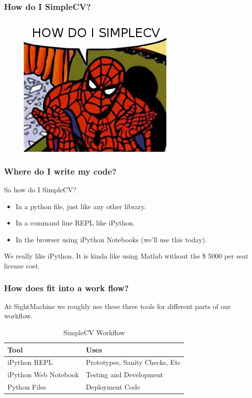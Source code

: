 \documentclass{beamer}
\begin{document}
\begin{frame}
\frametitle{How do I SimpleCV?}

\begin{figure}
  \includegraphics[width=0.4\linewidth]{howdoi.jpg}
\end{figure}

\end{frame}

 
\begin{frame}
\frametitle{Where do I write my code?}

\large{So how do I SimpleCV?}
\begin{itemize}
\item In a python file, just like any other library.
\item In a command line REPL like iPython.
\item In the browser using iPython Notebooks (we'll use this today).
\end{itemize}
We really like iPython. It is kinda like using Matlab without the \$ 5000
per seat license cost. 
\end{frame}


\begin{frame}
\frametitle{How does fit into a work flow?}
At SightMachine we roughly use these three tools 
for different parts of our workflow.
\begin{table}
\begin{tabular}{l l }
\toprule
\textbf{Tool} & \textbf{Uses} \\
\midrule
iPython REPL & Prototypes, Sanity Checks, Etc \\
iPython Web Notebook & Testing and Development \\
Python Files  & Deployment Code \\
\bottomrule
\end{tabular}
\caption{SimpleCV Workflow}
\end{table}
\end{frame}
\end{document}
